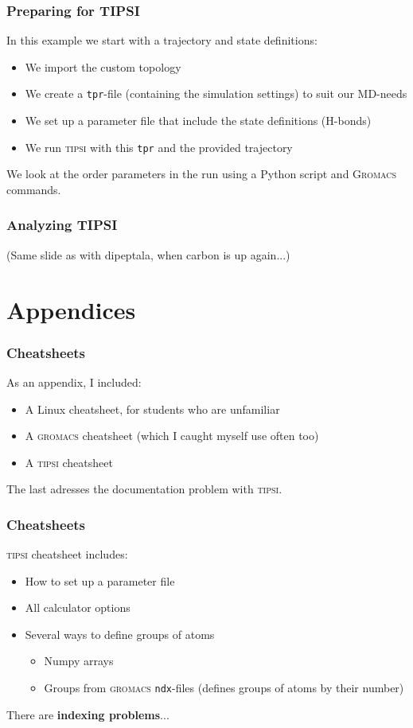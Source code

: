 \documentclass[hyperref={pdfpagelabels=false}]{beamer}
\begin{document}
\begin{frame}
\frametitle{Preparing for \textsc{TIPSI}} 
In this example we start with a trajectory and state definitions:
\begin{itemize}
\item We import the custom topology
\item We create a \texttt{tpr}-file (containing the simulation settings) to suit our MD-needs
\item We set up a parameter file that include the state definitions (H-bonds)
\item We run \textsc{tipsi} with this \texttt{tpr} and the provided trajectory
\end{itemize}
We look at the order parameters in the run using a Python script and \textsc{Gromacs} commands.
\end{frame}

\begin{frame}
\frametitle{Analyzing \textsc{TIPSI}}

(Same slide as with dipeptala, when carbon is up again...)

\end{frame}

\section{Appendices}
\setcounter{subsection}{1}

\begin{frame}
\frametitle{Cheatsheets}
As an appendix, I included:
\begin{itemize}
\item A Linux cheatsheet, for students who are unfamiliar
\item A \textsc{gromacs} cheatsheet (which I caught myself use often too)
\item A \textsc{tipsi} cheatsheet
\end{itemize}
The last adresses the documentation problem with \textsc{tipsi}.
\end{frame}

\begin{frame}
\frametitle{Cheatsheets}
\textsc{tipsi} cheatsheet includes:
\begin{itemize}
\item How to set up a parameter file
\item All calculator options
\item Several ways to define groups of atoms
\begin{itemize}
\item Numpy arrays
\item Groups from \textsc{gromacs} \texttt{ndx}-files (defines groups of atoms by their number)
\end{itemize}
\end{itemize}
There are \textbf{indexing problems}...
\end{frame}
\end{document}
